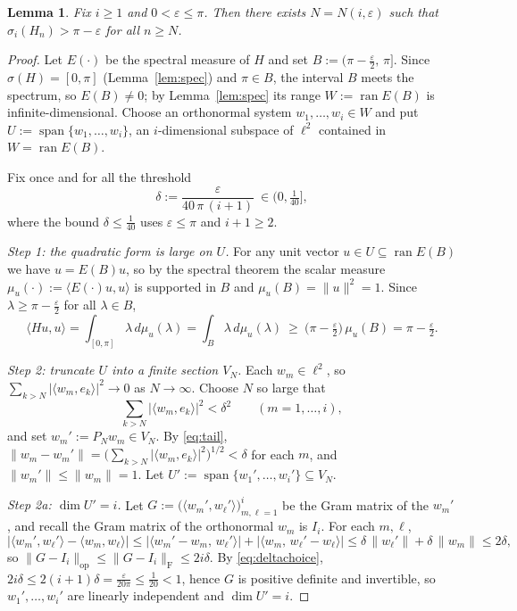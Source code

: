 \documentclass[12pt]{article}
\newtheorem{lemma}{Lemma}
\theoremstyle{remark}
\DeclareMathOperator{\ran}{ran}
\newcommand{\spec}{\sigma}
\begin{document}
\begin{lemma}\label{lem:lower}
Fix $i\ge1$ and $0<\varepsilon\le\pi$. Then there exists $N=N(i,\varepsilon)$ such that
$\sigma_i(H_n)>\pi-\varepsilon$ for all $n\ge N$.
\end{lemma}

\begin{proof}
Let $E(\cdot)$ be the spectral measure of $H$ and set $B:=(\pi-\tfrac{\varepsilon}{2},\,\pi]$.
Since $\spec(H)=[0,\pi]$ (Lemma~\ref{lem:spec}) and $\pi\in B$, the interval $B$ meets the
spectrum, so $E(B)\ne0$; by Lemma~\ref{lem:spec} its range $W:=\ran E(B)$ is infinite-dimensional.
Choose an orthonormal system $w_1,\dots,w_i\in W$ and put
$U:=\operatorname{span}\{w_1,\dots,w_i\}$, an $i$-dimensional subspace of $\ell^2$ contained in
$W=\ran E(B)$.

Fix once and for all the threshold
\begin{equation}\label{eq:deltachoice}
\delta:=\frac{\varepsilon}{40\,\pi\,(i+1)}\ \in(0,\tfrac1{40}] ,
\end{equation}
where the bound $\delta\le\frac1{40}$ uses $\varepsilon\le\pi$ and $i+1\ge2$.

\smallskip
\noindent\emph{Step 1: the quadratic form is large on $U$.}
For any unit vector $u\in U\subseteq\ran E(B)$ we have $u=E(B)u$, so by the spectral theorem the
scalar measure $\mu_u(\cdot):=\langle E(\cdot)u,u\rangle$ is supported in $B$ and
$\mu_u(B)=\|u\|^2=1$. Since $\lambda\ge\pi-\tfrac\varepsilon2$ for all $\lambda\in B$,
\begin{equation}\label{eq:formlarge}
\langle Hu,u\rangle=\int_{[0,\pi]}\lambda\,d\mu_u(\lambda)=\int_{B}\lambda\,d\mu_u(\lambda)
\ \ge\ \bigl(\pi-\tfrac\varepsilon2\bigr)\,\mu_u(B)=\pi-\tfrac\varepsilon2 .
\end{equation}

\smallskip
\noindent\emph{Step 2: truncate $U$ into a finite section $V_N$.}
Each $w_m\in\ell^2$, so $\sum_{k>N}|\langle w_m,e_k\rangle|^2\to0$ as $N\to\infty$. Choose $N$ so
large that
\begin{equation}\label{eq:tail}
\sum_{k>N}|\langle w_m,e_k\rangle|^2<\delta^2\qquad(m=1,\dots,i) ,
\end{equation}
and set $w_m':=P_N w_m\in V_N$. By \eqref{eq:tail},
$\|w_m-w_m'\|=\bigl(\sum_{k>N}|\langle w_m,e_k\rangle|^2\bigr)^{1/2}<\delta$ for each $m$, and
$\|w_m'\|\le\|w_m\|=1$. Let $U':=\operatorname{span}\{w_1',\dots,w_i'\}\subseteq V_N$.

\smallskip
\noindent\emph{Step 2a: $\dim U'=i$.} Let
$G:=\bigl(\langle w_m',w_\ell'\rangle\bigr)_{m,\ell=1}^i$ be the Gram matrix of the $w_m'$, and
recall the Gram matrix of the orthonormal $w_m$ is $I_i$. For each $m,\ell$,
\[
\bigl|\langle w_m',w_\ell'\rangle-\langle w_m,w_\ell\rangle\bigr|
\le\bigl|\langle w_m'-w_m,\,w_\ell'\rangle\bigr|+\bigl|\langle w_m,\,w_\ell'-w_\ell\rangle\bigr|
\le\delta\,\|w_\ell'\|+\delta\,\|w_m\|\le2\delta ,
\]
so $\|G-I_i\|_{\mathrm{op}}\le\|G-I_i\|_{\mathrm F}\le2i\delta$. By \eqref{eq:deltachoice},
$2i\delta\le2(i+1)\delta=\frac{\varepsilon}{20\pi}\le\frac1{20}<1$, hence $G$ is positive
definite and invertible, so $w_1',\dots,w_i'$ are linearly independent and $\dim U'=i$.


\end{proof}
\end{document}
